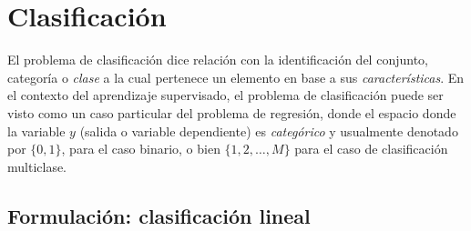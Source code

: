
\section{Clasificación}

El problema de clasificación dice relación con la identificación del conjunto, categoría o \emph{clase} a la cual pertenece un elemento en base a sus \emph{características}. En el contexto del aprendizaje supervisado, el problema de clasificación puede ser visto como un caso particular del problema de regresión, donde el espacio donde la variable  $y$ (salida o variable dependiente) es \emph{categórico} y usualmente denotado por $\{0,1\}$, para el caso binario, o bien $\{1,2,\ldots,M\}$ para el caso de clasificación multiclase. 
	

\subsection{Formulación: clasificación lineal}
\label{sec:clasif_lineal}

